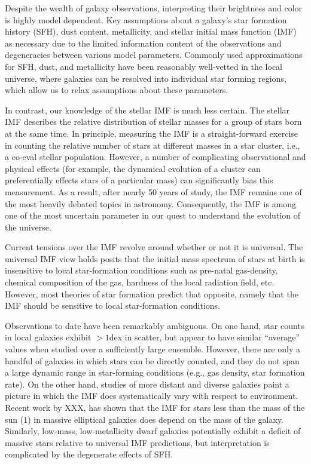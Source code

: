 \documentclass[11pt,preprint]{aastex}
\begin{document}
Despite the wealth of galaxy observations, interpreting their brightness and color is highly model dependent.  Key assumptions about a galaxy's star formation history (SFH), dust content, metallicity, and stellar initial mass function (IMF) as necessary due to the limited information content of the observations and degeneracies between various model parameters.  Commonly used approximations for SFH, dust, and metallicity have been reasonably well-vetted in the local universe, where galaxies can be resolved into individual star forming regions, which allow us to relax assumptions about these parameters.

In contrast, our knowledge of the stellar IMF is much less certain.  The stellar IMF describes the relative distribution of stellar masses for a group of stars born at the same time.  In principle, measuring the IMF is a straight-forward exercise in counting the relative number of stars at different masses in a star cluster, i.e., a co-eval stellar population.  However, a number of complicating observational and physical effects (for example, the dynamical evolution of a cluster can preferentially effects stars of a particular mass) can significantly bias this measurement.  As a result, after nearly 50 years of study, the IMF remains one of the most heavily debated topics in astronomy.  Consequently, the IMF is among one of the most uncertain parameter in our quest to understand the evolution of the universe.

Current tensions over the IMF revolve around whether or not it is universal.  The universal IMF view holds posits that the initial mass spectrum of stars at birth is insensitive to local star-formation conditions such as pre-natal gas-density, chemical composition of the gas, hardness of the local radiation field, etc.  However, most theories of star formation predict that opposite, namely that the IMF should be sensitive to local star-formation conditions.

Observations to date have been remarkably ambiguous.  On one hand, star counts in local galaxies exhibit $>1$dex in scatter, but appear to have similar ``average'' values when studied over a sufficiently large ensemble.  However, there are only a handful of galaxies in which stars can be directly counted, and they do not span a large dynamic range in star-forming conditions (e.g., gas density, star formation rate).  On the other hand, studies of more distant and diverse galaxies paint a picture in which the IMF does systematically vary with respect to environment.  Recent work by XXX, has shown that the IMF for stars less than the mass of the sun (1\msun) in massive elliptical galaxies does depend on the mass of the galaxy.  Similarly, low-mass, low-metallicity dwarf galaxies potentially exhibit a deficit of massive stars relative to universal IMF predictions, but interpretation is complicated by the degenerate effects of SFH.  
\end{document}
